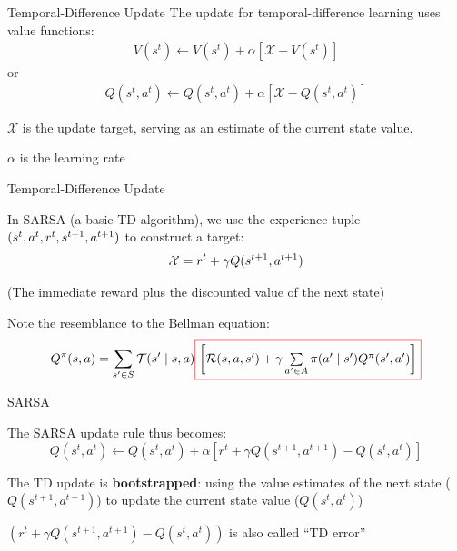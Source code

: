 \begin{frame}{Temporal-Difference Update}
    The update for temporal-difference learning uses value functions:
    \vspace{0pt}
    \begin{align*}
        V(s^{t}) \gets V(s^{t}) + \alpha \left[\mathcal{X} - V(s^{t})\right]
    \end{align*}
    or 
    \vspace{0pt}
    \begin{align*}
        Q(s^{t}, a^{t}) \gets Q(s^{t}, a^{t})  + \alpha \left[\mathcal{X} - Q(s^{t}, a^{t})\right]
    \end{align*}
	\blist
    	\item $\mathcal{X}$ is the update target, serving as an estimate of the current state value. 
    	\item $\alpha$ is the learning rate
    \elist
\end{frame}

\begin{frame}{Temporal-Difference Update}
    
    In SARSA (a basic TD algorithm), we use the experience tuple $(s^{t}, a^{t}, r^{t}, s^{t+1}, a^{t+1})$ to construct a target:
    \begin{align*}
        \mathcal{X} = r^t + \gamma Q(s^{t+1}, a^{t+1})
    \end{align*}
    
    (The immediate reward plus the discounted value of the next state)
    
    Note the resemblance to the Bellman equation:
    \begin{align*}
        Q^{\pi}(\st, \ac) = \sum_{\st' \in \St} \Stf(\st' \mid \st, \ac) \Cboxed{red}{$\left[\Rew(\st, \ac, \st') + \gamma \sum\limits_{a' \in \Ac} \pi(a' \mid s') Q^{\pi}(s', a')\right]$}
    \end{align*}
\end{frame}

\begin{frame}{SARSA}
    
The SARSA update rule thus becomes:
$$
  Q(s^t, a^t) \leftarrow Q(s^t, a^t) + \alpha[r^t + \gamma Q(s^{t+1}, a^{t+1})- Q(s^t,a^t)] 
$$

\vspace{5pt}

\blist
	\itemsep=10pt
	\item The TD update is \textbf{bootstrapped}: using the value estimates of the next state ($Q(s^{t+1}, a^{t+1})$) to update the current state value ($Q(s^t,a^t)$)
    \item $\left( r^t + \gamma Q(s^{t+1}, a^{t+1})- Q(s^t,a^t) \right)$ is also called ``TD error''
\elist

\end{frame}

